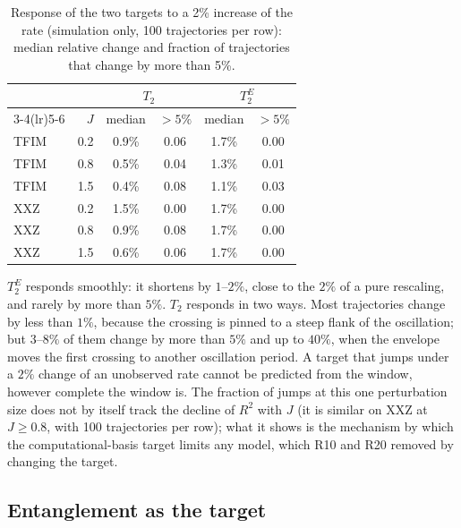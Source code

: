 \documentclass[twocolumn,10pt]{article}
\begin{document}
\begin{table}[h]
\centering
\caption{Response of the two targets to a 2\% increase of the rate
  (simulation only, 100 trajectories per row): median relative change and
  fraction of trajectories that change by more than 5\%.\label{tab:r23c}}
\footnotesize
\setlength{\tabcolsep}{3pt}
\begin{tabular}{lrcccc}
\toprule
 & & \multicolumn{2}{c}{$T_2$} & \multicolumn{2}{c}{$T_2^E$} \\
\cmidrule(lr){3-4}\cmidrule(lr){5-6}
 & $J$ & median & $>5\%$ & median & $>5\%$ \\
\midrule
TFIM & 0.2 & 0.9\% & 0.06 & 1.7\% & 0.00 \\
TFIM & 0.8 & 0.5\% & 0.04 & 1.3\% & 0.01 \\
TFIM & 1.5 & 0.4\% & 0.08 & 1.1\% & 0.03 \\
XXZ & 0.2 & 1.5\% & 0.00 & 1.7\% & 0.00 \\
XXZ & 0.8 & 0.9\% & 0.08 & 1.7\% & 0.00 \\
XXZ & 1.5 & 0.6\% & 0.06 & 1.7\% & 0.00 \\
\bottomrule
\end{tabular}
\end{table}

$T_2^E$ responds smoothly: it shortens by $1$--$2\%$, close to the
$2\%$ of a pure rescaling, and rarely by more than $5\%$. $T_2$ responds
in two ways. Most trajectories change by less than $1\%$, because the
crossing is pinned to a steep flank of the oscillation; but $3$--$8\%$
of them change by more than $5\%$ and up to $40\%$, when the envelope
moves the first crossing to another oscillation period. A target that
jumps under a $2\%$ change of an unobserved rate cannot be predicted
from the window, however complete the window is. The fraction of jumps
at this one perturbation size does not by itself track the decline of
$R^2$ with $J$ (it is similar on XXZ at $J \ge 0.8$, with 100
trajectories per row); what it shows is the mechanism by which the
computational-basis target limits any model, which R10 and R20 removed
by changing the target.

\subsection{Entanglement as the target}
\label{sec:r24}
\end{document}
